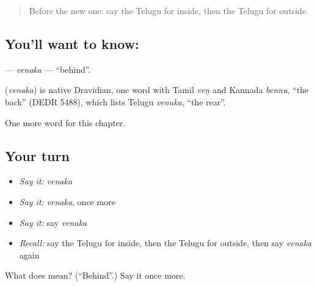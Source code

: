 \begin{quote}
Before the new one: say the Telugu for inside, then the Telugu for outside.
\end{quote}

\subsection*{You'll want to know: }
\textbf{} — \emph{venaka} — \textquotedblleft{}behind\textquotedblright{}.

\begin{cousinweb}
\textbf{} (\emph{venaka}) is native Dravidian, one word with Tamil \emph{veṉ} and Kannada \emph{bennu}, \textquotedblleft{}the back\textquotedblright{} (DEDR 5488), which lists Telugu \emph{venuka}, \textquotedblleft{}the rear\textquotedblright{}.
\end{cousinweb}

\begin{grammarlens}[title={What you've built}]
One more word for this chapter.
\end{grammarlens}

\subsection*{Your turn}
\begin{itemize}
\raggedright
  \item \emph{Say it:} \emph{venaka}
  \item \emph{Say it:} \emph{venaka}, once more
  \item \emph{Say it:} say \emph{venaka}
  \item \emph{Recall:} say the Telugu for inside, then the Telugu for outside, then say \emph{venaka} again
\end{itemize}

\begin{tcolorbox}[breakable,colback=teal!4,colframe=teal!35!black,title={Before you move on}]
What does  mean? (\textquotedblleft{}Behind\textquotedblright{}.) Say it once more.
\end{tcolorbox}
